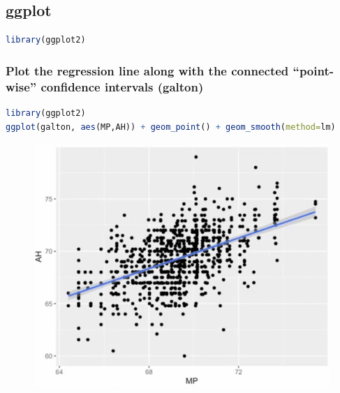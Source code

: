\documentclass[11pt,a4paper]{article}
\begin{document}
\subsection{ggplot}
\begin{lstlisting}[language=R]
library(ggplot2)
\end{lstlisting}
\subsubsection{Plot the regression line along with the connected “point-wise” confidence intervals (galton)}
\begin{lstlisting}[language=R]
library(ggplot2)
ggplot(galton, aes(MP,AH)) + geom_point() + geom_smooth(method=lm)
\end{lstlisting}
\begin{center}\begin{figure}[htbp]
    \centering
    \includegraphics[scale=0.5]{plot1.png}
    \caption{}
    \label{}
\end{figure}\end{center}
\end{document}
